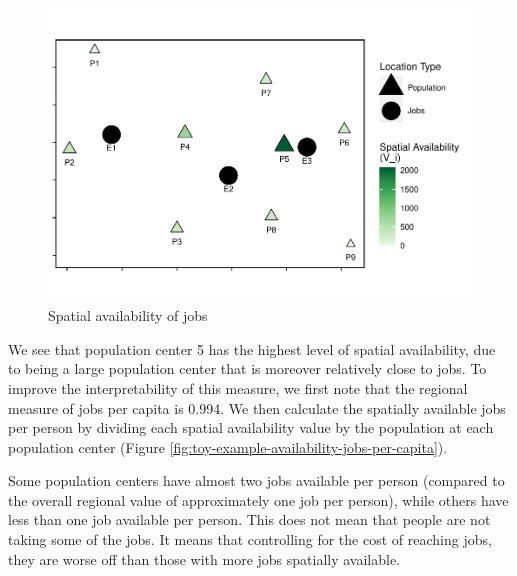 \documentclass[]{elsarticle} %
\begin{document}
\begin{figure}
\includegraphics[width=1\linewidth]{Spatial-Availability_files/figure-latex/toy-example-availability-jobs-1} \caption{\label{fig:toy-example-availability-jobs}Spatial availability of jobs}\label{fig:toy-example-availability-jobs}
\end{figure}

We see that population center 5 has the highest level of spatial
availability, due to being a large population center that is moreover
relatively close to jobs. To improve the interpretability of this
measure, we first note that the regional measure of jobs per capita is
0.994. We then calculate the spatially available jobs per person by
dividing each spatial availability value by the population at each
population center (Figure
\ref{fig:toy-example-availability-jobs-per-capita}).

Some population centers have almost two jobs available per person
(compared to the overall regional value of approximately one job per
person), while others have less than one job available per person. This
does not mean that people are not taking some of the jobs. It means that
controlling for the cost of reaching jobs, they are worse off than those
with more jobs spatially available.
\end{document}
